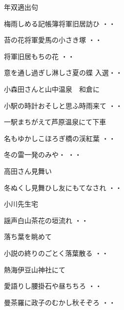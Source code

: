 年双適出句
\begin{shiika}梅雨しめる記帳簿将軍旧居訪ひ
\hfill{・・}\end{shiika}
\begin{shiika}苔の花将軍愛馬の小さき塚
\hfill{・・}\end{shiika}
\begin{shiika}将軍旧居もちの花
\hfill{・・}\end{shiika}
\begin{shiika}意を通し過ぎし淋しさ夏の蝶
\hfill{入選・・}\end{shiika}
\vspace{0.6cm}
小森田さんと山中温泉　和倉に
\begin{shiika}小駅の時計おそしと思ふ時雨来て
\hfill{・・}\end{shiika}
\vspace{0.6cm}
一駅まちがえて芦原温泉にて下車
\begin{shiika}名もゆかしこほろぎ橋の渓紅葉
\hfill{・・}\end{shiika}
\vspace{0.6cm}
\begin{shiika}冬の雷一発のみや・
\hfill{・・}\end{shiika}
\vspace{0.6cm}
高田さん見舞い
\begin{shiika}冬ぬくし見舞ひし友にもてなされ
\hfill{・・}\end{shiika}
\vspace{0.6cm}小川先生宅
\begin{shiika}謡声白山茶花の垣流れ
\hfill{・・}\end{shiika}
\vspace{0.6cm}
落ち葉を眺めて
\begin{shiika}小説の終りのごとく落葉散る
\hfill{・・}\end{shiika}
\vspace{0.6cm}
熱海伊豆山神社にて
\begin{shiika}愛語りし腰掛石や昼ちちろ
\hfill{・・}\end{shiika}
\vspace{0.6cm}
\begin{shiika}曼茶羅に政子のむかし秋そぞろ
\hfill{・・}\end{shiika}
